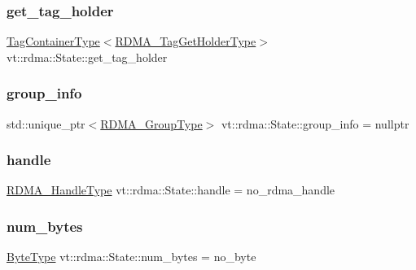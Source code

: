 \subsubsection{\texorpdfstring{get\+\_\+tag\+\_\+holder}{get\_tag\_holder}}
{\footnotesize\ttfamily \hyperlink{structvt_1_1rdma_1_1_state_ad84b403803cc575ef54d0d0ac74017e9}{Tag\+Container\+Type}$<$\hyperlink{structvt_1_1rdma_1_1_state_a10b0ce4a13ce643ca2a944dd05c601ff}{R\+D\+M\+A\+\_\+\+Tag\+Get\+Holder\+Type}$>$ vt\+::rdma\+::\+State\+::get\+\_\+tag\+\_\+holder\hspace{0.3cm}{\ttfamily [private]}}

\mbox{\label{structvt_1_1rdma_1_1_state_ad8dc4c1a674c5a0b14789a53e54815d3}} 
\subsubsection{\texorpdfstring{group\+\_\+info}{group\_info}}
{\footnotesize\ttfamily std\+::unique\+\_\+ptr$<$\hyperlink{structvt_1_1rdma_1_1_state_aec26643b760f80a59e0c07c580e99ebc}{R\+D\+M\+A\+\_\+\+Group\+Type}$>$ vt\+::rdma\+::\+State\+::group\+\_\+info = nullptr}

\mbox{\label{structvt_1_1rdma_1_1_state_ac6ea5c9dffcc795713d1766b1c3e7028}} 
\subsubsection{\texorpdfstring{handle}{handle}}
{\footnotesize\ttfamily \hyperlink{namespacevt_a10442579ec4e7ebef223818e64bcf908}{R\+D\+M\+A\+\_\+\+Handle\+Type} vt\+::rdma\+::\+State\+::handle = no\+\_\+rdma\+\_\+handle}

\mbox{\label{structvt_1_1rdma_1_1_state_a0c249d4fe06c8ec521ac6f68b064e8a2}} 
\subsubsection{\texorpdfstring{num\+\_\+bytes}{num\_bytes}}
{\footnotesize\ttfamily \hyperlink{namespacevt_aab8d55968084610ce3b17057981e9300}{Byte\+Type} vt\+::rdma\+::\+State\+::num\+\_\+bytes = no\+\_\+byte}

